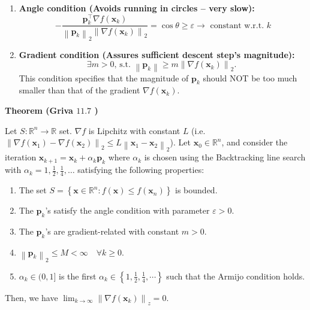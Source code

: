 \documentclass[11pt]{article}
\theoremstyle{plain} %
\newenvironment{topic}
{\color{C2}\normalfont\begin{framed}\begingroup }
  {\endgroup\end{framed}}
\theoremstyle{remark}
\begin{document}
\begin{topic}
\begin{enumerate}
    \item \textbf{Angle condition (Avoids running in circles -- very slow):}
          \[
            -\frac{\mathbf{p}_k^{\top} \nabla f\left(\mathbf{x}_k\right)}{\left\|\mathbf{p}_k\right\|_2\left\|\nabla f\left(\mathbf{x}_k\right)\right\|_2} = \cos{\theta}\geqslant \varepsilon \longrightarrow \text { constant w.r.t. } k
          \]

    \item \textbf{Gradient condition (Assures sufficient descent step's magnitude):}
          \[
            \exists m>0 \text {, s.t. }\left\|\mathbf{p}_k\right\| \geqslant m\left\|\nabla f\left(\mathbf{x}_k\right)\right\|_2 \text {. }
          \]
          This condition specifies that the magnitude of $\mathbf{p}_k$ should NOT be too much smaller than that of the gradient $\nabla f\left(\mathbf{x}_k\right)$.
  \end{enumerate}

  \textbf{Theorem (Griva $11.7$ )}

  Let $S: \mathbb{R}^n \rightarrow \mathbb{R}$ set. $\nabla f$ is Lipchitz with constant $L$ (i.e. $\left\|\nabla f\left(\mathbf{x}_1\right)-\nabla f\left(\mathbf{x}_2\right)\right\|_2 \le L\left\|\mathbf{x}_1-\mathbf{x}_2\right\|_2$).
  Let $\mathbf{x}_0 \in \mathbb{R}^n$, and consider the iteration $\mathbf{x}_{k+1}=\mathbf{x}_k+\alpha_k \mathbf{p}_k$ where $\alpha_k$ is chosen using the Backtracking line search with $\alpha_k=1, \frac{1}{2}, \frac{1}{4}, \ldots$ satisfying the following properties:
  \begin{enumerate}
    \item The set $S=\left\{\mathbf{x} \in \mathbb{R}^n: f(\mathbf{x}) \leqslant f\left(\mathbf{x}_n\right)\right\}$ is bounded.
    \item The $\mathbf{p}_k$'s satisfy the angle condition with parameter $\varepsilon>0$.
    \item The $\mathbf{p}_k$'s are gradient-related with constant $m>0$.
    \item $\left\|\mathbf{p}_k\right\|_2 \leq M<\infty \quad \forall k \geq 0$.
    \item $\alpha_k \in(0,1]$ is the first $\alpha_k \in\left\{1, \frac{1}{2}, \frac{1}{4}, \cdots\right\}$ such that the Armijo condition holds.
  \end{enumerate}
  Then, we have $\lim _{k \rightarrow \infty}\left\|\nabla f\left(\mathbf{x}_k\right)\right\|_z=0$.

\end{topic}
\end{document}
